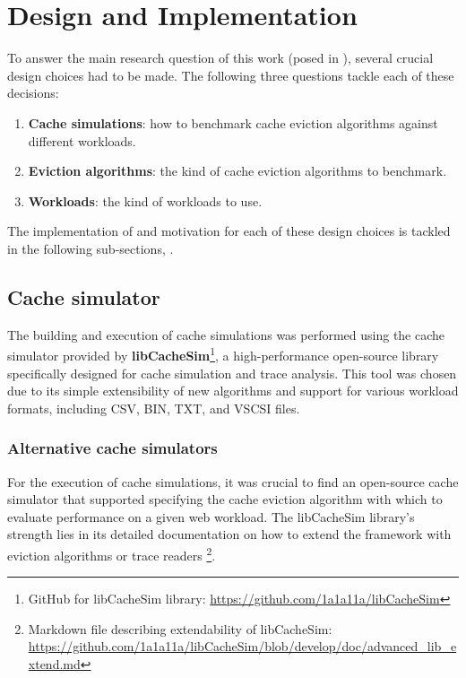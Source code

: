 \chapter{Design and Implementation}

To answer the main research question of this work (posed in ), several crucial design choices had to be made. The following three questions tackle each of these decisions:

\begin{enumerate}
    \item \textbf{Cache simulations}: how to benchmark cache eviction algorithms against different workloads.
    \item \textbf{Eviction algorithms}: the kind of cache eviction algorithms to benchmark.
    \item \textbf{Workloads}: the kind of workloads to use.
\end{enumerate}


The implementation of and motivation for each of these design choices is tackled in the following sub-sections, .

\section{Cache simulator}\label{sec: cache-simulations}


The building and execution of cache simulations was performed using the cache simulator provided by \textbf{libCacheSim}\footnote{GitHub for libCacheSim library: \url{https://github.com/1a1a11a/libCacheSim}}, a high-performance open-source library specifically designed for cache simulation and trace analysis. This tool was chosen due to its simple extensibility of new algorithms and support for various workload formats, including CSV, BIN, TXT, and VSCSI files. 

\subsection{Alternative cache simulators}

For the execution of cache simulations, it was crucial to find an open-source cache simulator that supported specifying the cache eviction algorithm with which to evaluate performance on a given web workload. The libCacheSim library's strength lies in its detailed documentation on how to extend the framework with eviction algorithms or trace readers \footnote{Markdown file describing extendability of libCacheSim: \url{https://github.com/1a1a11a/libCacheSim/blob/develop/doc/advanced_lib_extend.md}}.


